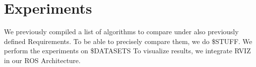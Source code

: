 \documentclass[main.tex]{subfiles}
\begin{document}
\section{Experiments}
We previously compiled a list of algorithms to compare under also previously defined Requirements.
To be able to precisely compare them, we do \$STUFF.
We perform the experiments on \$DATASETS
To visualize results, we integrate RVIZ in our ROS Architecture.
\end{document}
